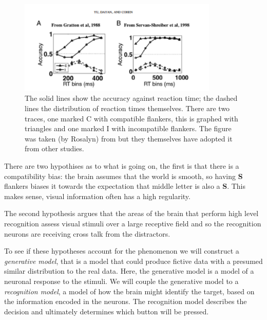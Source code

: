 \documentclass[12pt]{article}
\begin{document}
\begin{figure}[tb]
\begin{center}
  \includegraphics[width=9.5cm]{fig_rt_accurate.png}
\end{center}
\caption{The solid lines show the accuracy against reaction
  time; the dashed lines the distribution of reaction times themselves. There are two traces, one marked C with compatible flankers, this is graphed with triangles and one marked I with incompatible flankers. The figure was taken (by Rosalyn) from \cite{YuDayanCohen2009} but they themselves have adopted it from other studies. \label{fig_rt_accurate}}
\end{figure}

{}

There are two hypothises as to what is going on, the first is that
there is a compatibility bias: the brain assumes that the world is
smooth, so having \textbf{S} flankers biases it towards the
expectation that middle letter is also a \textbf{S}. This makes sense,
visual information often has a high regularity. 

The second hypothesis argues that the areas of the brain that perform
high level recognition assess visual stimuli over a large receptive
field and so the recognition neurons are receiving cross talk from the
distractors.

To see if these hypotheses account for the phenomenon we will
construct a \textsl{generative model}, that is a model that could
produce fictive data with a presumed similar distribution to the real
data. Here, the generative model is a model of a neuronal response to
the stimuli. We will couple the generative model to a
\textsl{recognition model}, a model of how the brain might identify
the target, based on the information encoded in the neurons. The
recognition model describes the decision and ultimately determines
which button will be pressed. 
\end{document}
